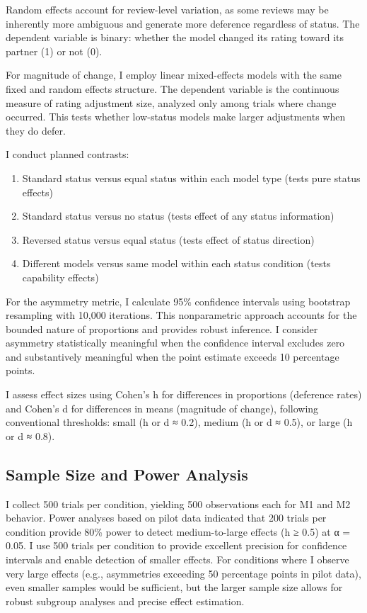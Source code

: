 Random effects account for review-level variation, as some reviews may be inherently more ambiguous and generate more deference regardless of status. The dependent variable is binary: whether the model changed its rating toward its partner (1) or not (0).

For magnitude of change, I employ linear mixed-effects models with the same fixed and random effects structure. The dependent variable is the continuous measure of rating adjustment size, analyzed only among trials where change occurred. This tests whether low-status models make larger adjustments when they do defer.

I conduct planned contrasts:
\begin{enumerate}
\item Standard status versus equal status within each model type (tests pure status effects)
\item Standard status versus no status (tests effect of any status information)
\item Reversed status versus equal status (tests effect of status direction)
\item Different models versus same model within each status condition (tests capability effects)
\end{enumerate}

For the asymmetry metric, I calculate 95\% confidence intervals using bootstrap resampling with 10,000 iterations. This nonparametric approach accounts for the bounded nature of proportions and provides robust inference. I consider asymmetry statistically meaningful when the confidence interval excludes zero and substantively meaningful when the point estimate exceeds 10 percentage points.

I assess effect sizes using Cohen's h for differences in proportions (deference rates) and Cohen's d for differences in means (magnitude of change), following conventional thresholds: small (h or d ≈ 0.2), medium (h or d ≈ 0.5), or large (h or d ≈ 0.8).

\subsection*{Sample Size and Power Analysis}

I collect 500 trials per condition, yielding 500 observations each for M1 and M2 behavior. Power analyses based on pilot data indicated that 200 trials per condition provide 80\% power to detect medium-to-large effects (h ≥ 0.5) at α = 0.05. I use 500 trials per condition to provide excellent precision for confidence intervals and enable detection of smaller effects. For conditions where I observe very large effects (e.g., asymmetries exceeding 50 percentage points in pilot data), even smaller samples would be sufficient, but the larger sample size allows for robust subgroup analyses and precise effect estimation.

